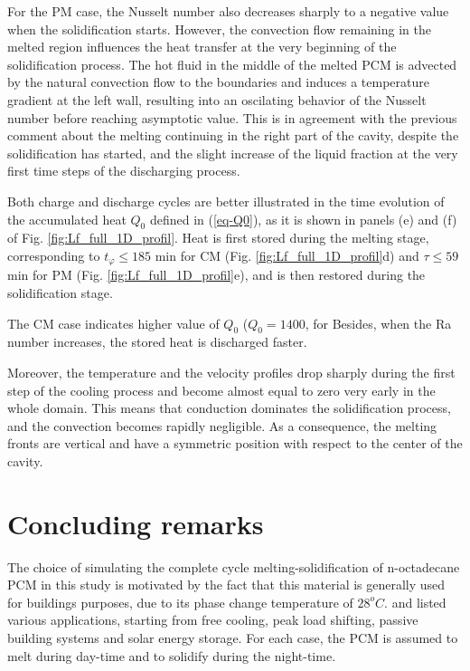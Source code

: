 For the PM case, the Nusselt number also decreases sharply to a negative value when the solidification starts.
However, the convection flow remaining in the melted region influences the heat transfer at the very beginning of the solidification process.
The hot fluid in the middle of the melted PCM is advected by the natural convection flow to the boundaries and induces a temperature gradient at the left wall, resulting into an oscilating behavior of the Nusselt number before reaching asymptotic value.
This is in agreement with the previous comment about the melting continuing in the right part of the cavity, despite the solidification has started, and the slight increase of the liquid fraction at the very first time steps of the discharging process.


Both charge and  discharge cycles are better illustrated in the time evolution of the accumulated heat $Q_0$ defined in (\ref{eq-Q0}), as it is shown in panels (e) and (f) of Fig.  \ref{fig:Lf_full_1D_profil}.
Heat is first stored during the melting stage, corresponding to $t_{\varphi} \leq 185$ min for CM (Fig. \ref{fig:Lf_full_1D_profil}d) and $\tau \leq 59$ min for PM (Fig. \ref{fig:Lf_full_1D_profil}e), and is then restored during the solidification stage.

\noindent The CM case indicates higher value of $Q_0$ ($Q_0 = 1400$, for  
Besides, when the Ra number increases, the stored heat is discharged faster.

\noindent Moreover, the temperature and the velocity profiles drop sharply during the first step of the cooling process and become almost equal to zero very early in the whole domain.
This means that conduction dominates the solidification process, and the convection becomes rapidly negligible.
As a consequence, the melting fronts are vertical and have a symmetric position with respect to the center of the cavity. \\

\section{Concluding remarks}
The choice of simulating the complete cycle melting-solidification of n-octadecane PCM in this study is motivated by the fact that this material is generally used for buildings purposes, due to its phase change temperature of  $28^{o}C$.
\cite{zhu2009dynamic} and \cite{kalnaes2015phase} listed various applications, starting from free cooling, peak load shifting, passive building systems and solar energy storage.
For each case, the PCM is assumed to melt during day-time and to solidify during the night-time.

